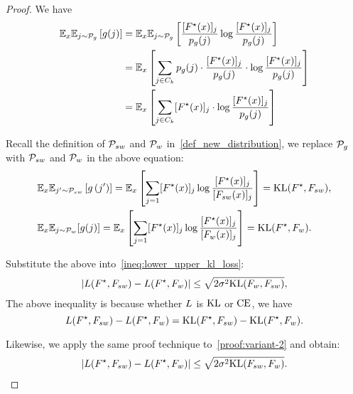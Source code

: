\begin{proof}
We have
\begin{align*}
    \mathbb{E}_x\mathbb{E}_{j \sim \mathcal{P}_g} \left[g(j)\right] & = \mathbb{E}_x \mathbb{E}_{j \sim \mathcal{P}_g} \left[\frac{[F^\star(x)]_j}{p_g(j)} \log \frac{[F^\star(x)]_j}{p_g(j)} \right] \\
    & = \mathbb{E}_x \left[\sum_{j \in C_k} p_g(j) \cdot \frac{[F^\star(x)]_j}{p_g(j)} \cdot \log \frac{[F^\star(x)]_j}{p_g(j)} \right] \\
    & = \mathbb{E}_x \left[\sum_{j \in C_k} [F^\star(x)]_j \cdot \log \frac{[F^\star(x)]_j}{p_g(j)} \right]
\end{align*}

Recall the definition of $\mathcal{P}_{sw}$ and $\mathcal{P}_w$ in~\eqref{def_new_distribution}, we replace $\mathcal{P}_g$ with $\mathcal{P}_{sw}$ and $\mathcal{P}_w$ in the above equation:
\begin{align*}
    & \mathbb{E}_x\mathbb{E}_{j^{\prime} \sim \mathcal{P}_{sw}}\left[g\left(j^{\prime}\right)\right] = \mathbb{E}_x \left[ \sum_{j=1} [F^\star(x)]_j \log \frac{[F^\star(x)]_j}{[F_{sw}(x)]_j} \right] = \mathrm{KL}(F^\star, F_{sw}), \\
    & \mathbb{E}_x\mathbb{E}_{j \sim \mathcal{P}_w}[g(j)] = \mathbb{E}_x \left[ \sum_{j=1} [F^\star(x)]_j \log \frac{[F^\star(x)]_j}{[F_{w}(x)]_j} \right] = \mathrm{KL}(F^\star, F_{w}).
\end{align*}

Substitute the above into~\eqref{ineq:lower_upper_kl_loss}:
\begin{align} \label{ineq:temp-1}
    \left| L(F^\star, F_{sw})-L(F^\star, F_{w}) \right| \le \sqrt{2\sigma^2 \mathrm{KL}(F_w, F_{sw})},
\end{align}
The above inequality is because whether $L$ is $\mathrm{KL}$ or $\mathrm{CE}$, we have 
$$L(F^\star, F_{sw})-L(F^\star, F_{w}) = \mathrm{KL}(F^\star, F_{sw})-\mathrm{KL}(F^\star, F_{w}).$$

Likewise, we apply the same proof technique to~\eqref{proof:variant-2} and obtain:
\begin{align} \label{proof:variant-3}
    \left| L(F^\star, F_{sw})-L(F^\star, F_{w}) \right| \le \sqrt{2\sigma^2 \mathrm{KL}(F_{sw}, F_w)}.
\end{align}


\end{proof}
